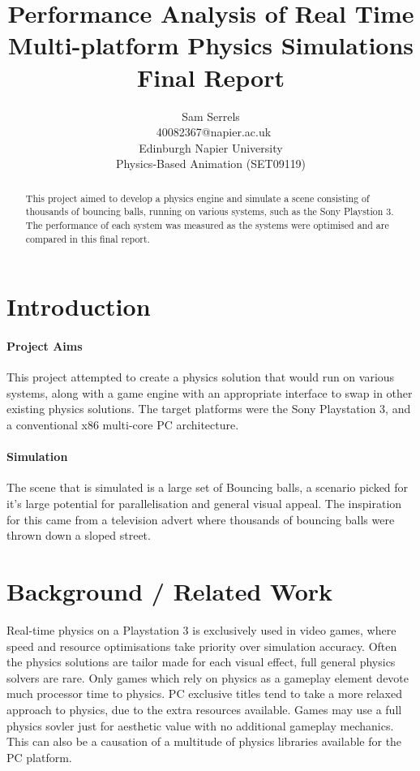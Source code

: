 \documentclass[conference]{acmsiggraph}
\title{Performance Analysis of Real Time Multi-platform Physics Simulations \\
	   Final Report}
\author{Sam Serrels\\\ 40082367@napier.ac.uk \\
Edinburgh Napier University\\
Physics-Based Animation (SET09119)}
\begin{document}

\maketitle

\begin{abstract}
This project aimed to develop a physics engine and simulate a scene consisting of thousands of bouncing balls, running on various systems, such as the Sony Playstion 3.
The performance of each system was measured as the systems were optimised and are compared in this final report.
\end{abstract}

\keywordlist

\section{Introduction}

\paragraph{Project Aims}
This project attempted to create a physics solution that would run on various systems, along with a game engine with an appropriate interface to swap in other existing physics solutions. 
The target platforms were the Sony Playstation 3, and a conventional x86 multi-core PC architecture.

\paragraph{Simulation}
The scene that is simulated is a large set of Bouncing balls, a scenario picked for it's large potential for parallelisation and general visual appeal. The inspiration for this came from a television advert where thousands of bouncing balls were thrown down a sloped street.

\section{Background / Related Work}
Real-time physics on a Playstation 3 is exclusively used in video games, where speed and resource optimisations take priority over simulation accuracy. Often the physics solutions are tailor made for each visual effect, full general physics solvers are rare. Only games which rely on physics as a gameplay element devote much processor time to physics.
PC exclusive titles tend to take a more relaxed approach to physics, due to the extra resources available. Games may use a full physics sovler just for aesthetic value with no additional gameplay mechanics. This can also be a causation of a multitude of physics libraries available for the PC platform.
\end{document}
